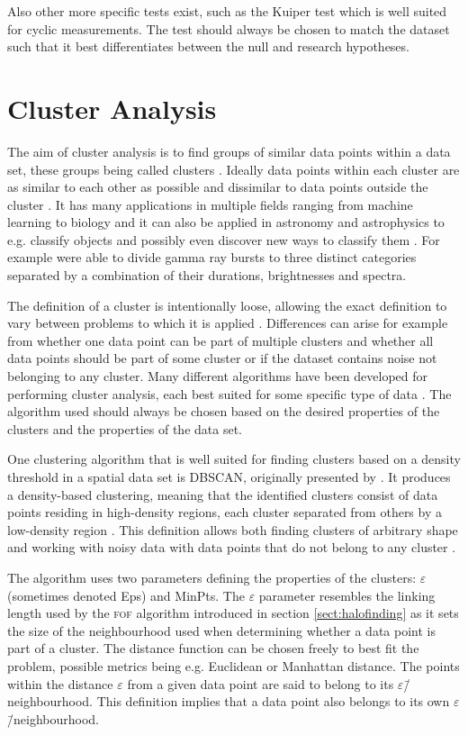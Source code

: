 \documentclass[english, oneside]{HYgradu}
\begin{document}
Also other more specific tests exist, such as the Kuiper test which is well suited for cyclic measurements. The test should always be chosen to match the dataset such that it best differentiates between the null and research hypotheses.

\section{Cluster Analysis}
The aim of cluster analysis is to find groups of similar data points within a data set, these groups being called clusters \citep{han2000data}. Ideally data points within each cluster are as similar to each other as possible and dissimilar to data points outside the cluster \citep{han2000data}. It has many applications in multiple fields ranging from machine learning to biology and it can also be applied in astronomy and astrophysics to e.g. classify objects and possibly even discover new ways to classify them \citep{ball2010data, han2000data}. For example \citet{mukherjee1998three} were able to divide gamma ray bursts to three distinct categories separated by a combination of their durations, brightnesses and spectra.

The definition of a cluster is intentionally loose, allowing the exact definition to vary between problems to which it is applied \citep{tan2006introduction}. Differences can arise for example from whether one data point can be part of multiple clusters and whether all data points should be part of some cluster or if the dataset contains noise not belonging to any cluster. Many different algorithms have been developed for performing cluster analysis, each best suited for some specific type of data \citep{han2000data}. The algorithm used should always be chosen based on the desired properties of the clusters and the properties of the data set.

One clustering algorithm that is well suited for finding clusters based on a density threshold in a spatial data set is DBSCAN, originally presented by \citet{ester1996density}. It produces a density-based clustering, meaning that the identified clusters consist of data points residing in high-density regions, each cluster separated from others by a low-density region \citep{han2000data}. This definition allows both finding clusters of arbitrary shape and working with noisy data with data points that do not belong to any cluster \citep{ester1996density}.

The algorithm uses two parameters defining the properties of the clusters: $\varepsilon$ (sometimes denoted Eps) and MinPts. The $\varepsilon$ parameter resembles the linking length used by the \textsc{fof} algorithm introduced in section \ref{sect:halofinding} as it sets the size of the neighbourhood used when determining whether a data point is part of a cluster. The distance function can be chosen freely to best fit the problem, possible metrics being e.g. Euclidean or Manhattan distance. The points within the distance $\varepsilon$ from a given data point are said to belong to its $\varepsilon$\=/neighbourhood. This definition implies that a data point also belongs to its own $\varepsilon$\=/neighbourhood.
\end{document}
